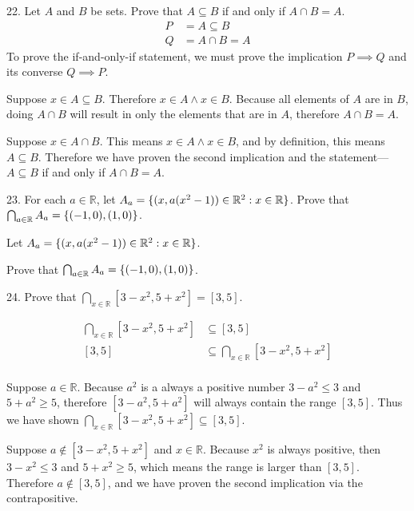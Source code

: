 \documentclass[openany, 12pt]{book}
\begin{document}
\begin{exercise}{}{}
	{22. Let $A$ and $B$ be sets. Prove that $A \subseteq B$ if and only if $A \cap B=A$.}
	\begin{align*}
		P & = A \subseteq B \\
		Q & = A \cap B = A
	\end{align*}
	To prove the if-and-only-if statement, we must prove the implication $P\implies
		Q$ and its converse $Q\implies P$.
	\begin{alist}
		\item Suppose $x\in A\subseteq B$. Therefore $x\in A \land x\in B$. Because all
		elements of $A$ are in $B$, doing $A\cap B$ will result in only the
		elements that are in $A$, therefore $A\cap B=A$.
		\item Suppose $x\in A\cap B$.  This means $x\in A \land x\in B$, and by
		definition, this means $A\subseteq B$. Therefore we have proven the second
		implication and the statement---$A \subseteq B$ if and only if $A \cap B=A$.
	\end{alist}
\end{exercise}

\begin{exercise}{}{}
	{23. For each $a \in \mathbb{R}$, let $A_a=\{(x,
				a(x^2-1)) \in \mathbb{R}^2: x \in \mathbb{R}\}$.
		Prove that $\bigcap_{a \in \mathbb{R}} A_a=\{(-1,0),(1,0)\}$.}
	\begin{alist}
		\item Let $A_a=\{(x, a(x^2-1)) \in \mathbb{R}^2: x \in \mathbb{R}\}$.
		\item Prove that $\bigcap_{a \in \mathbb{R}} A_a=\{(-1,0),(1,0)\}$.
	\end{alist}
\end{exercise}

\begin{exercise}{}{}
	{24. Prove that $\bigcap_{x \in \mathbb{R}}\left[3-x^2, 5+x^2\right]=[3,5]$.}
	\begin{alist}
		\item
		\begin{align*}
			\bigcap_{x\in\mathbb{R}}\left[3-x^2, 5+x^2\right] & \subseteq [3,5]                                               \\
			[3,5]                                             & \subseteq \bigcap_{x \in \mathbb{R}}\left[3-x^2, 5+x^2\right] \\
		\end{align*}
		\item
		Suppose $a\in\mathbb{R}$. Because $a^2$ is a always a positive number $3-a^2\leq3$
		and $5+a^2\geq 5$, therefore $[3-a^2, 5+a^2]$ will always contain the range $[3,
					5]$. Thus we have shown
		$\bigcap_{x\in\mathbb{R}}\left[3-x^2, 5+x^2\right]\subseteq [3,5]$.
		\item Suppose $a \notin [3-x^2, 5+x^2]$ and $x\in \mathbb{R}$. Because $x^2$ is
		always positive, then $3-x^2\leq3$ and $5+x^2\geq 5$, which means the range
		is larger than $[3, 5]$. Therefore $a \notin [3, 5]$, and we have proven the
		second implication via the contrapositive.
	\end{alist}
\end{exercise}
\end{document}
